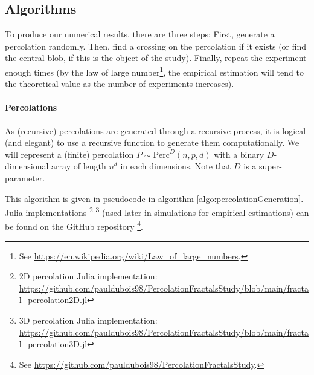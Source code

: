 \subsection{Algorithms}\label{algorithms}
To produce our numerical results, there are three steps: 
First, generate a percolation randomly.
Then, find a crossing on the percolation if it exists (or find the central blob, if this is the object of the study).
Finally, repeat the experiment enough times (by the law of large number\footnote{See \url{https://en.wikipedia.org/wiki/Law_of_large_numbers}.}, the empirical estimation will tend to the theoretical value as the number of experiments increases).

\paragraph{Percolations}
As (recursive) percolations are generated through a recursive process, it is logical (and elegant) to use a recursive function to generate them computationally.
We will represent a (finite) percolation $P \sim \text{Perc}^D(n,p,d)$ with a binary $D$-dimensional array of length $n^d$ in each dimensions.
Note that $D$ is a super-parameter.

This algorithm is given in pseudocode in algorithm \ref{algo:percolationGeneration}. Julia implementations
\footnote{2D percolation Julia implementation: \url{https://github.com/pauldubois98/PercolationFractalsStudy/blob/main/fractal\_percolation2D.jl}}
\footnote{3D percolation Julia implementation: \url{https://github.com/pauldubois98/PercolationFractalsStudy/blob/main/fractal\_percolation3D.jl}}
(used later in simulations for empirical estimations) can be found on the GitHub repository
\footnote{See \url{https://github.com/pauldubois98/PercolationFractalsStudy}.}.

